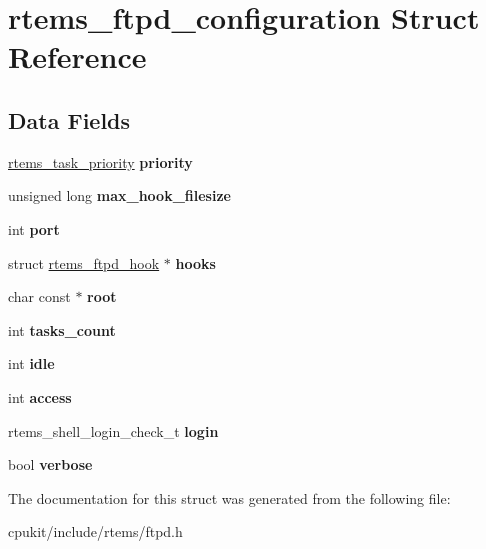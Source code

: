 \hypertarget{structrtems__ftpd__configuration}{}\section{rtems\+\_\+ftpd\+\_\+configuration Struct Reference}
\label{structrtems__ftpd__configuration}
\subsection*{Data Fields}
\begin{DoxyCompactItemize}
\item 
\mbox{\label{structrtems__ftpd__configuration_ac989ed2073326c4fdbb5ad2e613376fb}} 
\mbox{\hyperlink{group__ClassicTasks_gaa80a0c0938307d1e99d0eb5fee765b47}{rtems\+\_\+task\+\_\+priority}} {\bfseries priority}
\item 
\mbox{\label{structrtems__ftpd__configuration_abf4075c5435fac744e2c0889797e509f}} 
unsigned long {\bfseries max\+\_\+hook\+\_\+filesize}
\item 
\mbox{\label{structrtems__ftpd__configuration_af2e549e4414def967b75cd71fd51979d}} 
int {\bfseries port}
\item 
\mbox{\label{structrtems__ftpd__configuration_a2246876eb5caded53a106510c8a92517}} 
struct \mbox{\hyperlink{structrtems__ftpd__hook}{rtems\+\_\+ftpd\+\_\+hook}} $\ast$ {\bfseries hooks}
\item 
\mbox{\label{structrtems__ftpd__configuration_a0d95929d6a7c73f5ef15b99250042dbf}} 
char const  $\ast$ {\bfseries root}
\item 
\mbox{\label{structrtems__ftpd__configuration_a203c7668617f0ee63e2ae22c2a3b56cf}} 
int {\bfseries tasks\+\_\+count}
\item 
\mbox{\label{structrtems__ftpd__configuration_a98bb472243155a358f87e8bb706a1606}} 
int {\bfseries idle}
\item 
\mbox{\label{structrtems__ftpd__configuration_a803f62fe47dd66450955df29dac9f722}} 
int {\bfseries access}
\item 
\mbox{\label{structrtems__ftpd__configuration_a9ad0a1a5bf67ddf66e94f2c137bea27a}} 
rtems\+\_\+shell\+\_\+login\+\_\+check\+\_\+t {\bfseries login}
\item 
\mbox{\label{structrtems__ftpd__configuration_af247ef22788b935a8fdae8a1485561d8}} 
bool {\bfseries verbose}
\end{DoxyCompactItemize}


The documentation for this struct was generated from the following file\+:\begin{DoxyCompactItemize}
\item 
cpukit/include/rtems/ftpd.\+h\end{DoxyCompactItemize}
